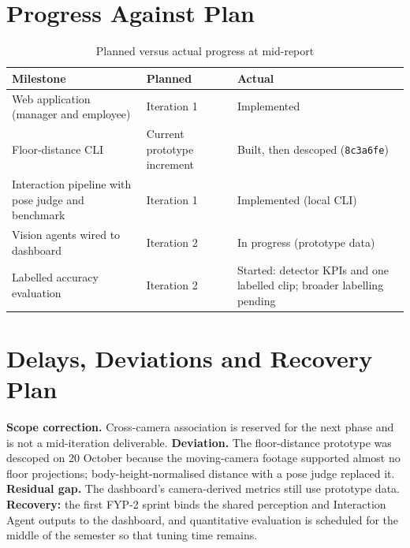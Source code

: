 \section{Progress Against Plan}
\begin{table}[H]
\centering
\caption{Planned versus actual progress at mid-report}
\begin{tabular}{P{0.34\textwidth}P{0.2\textwidth}P{0.3\textwidth}}
\toprule
Milestone & Planned & Actual\\
\midrule
Web application (manager and employee) & Iteration 1 & Implemented\\
Floor-distance CLI & Current prototype increment & Built, then descoped (\texttt{8c3a6fe})\\
Interaction pipeline with pose judge and benchmark & Iteration 1 & Implemented (local CLI)\\
Vision agents wired to dashboard & Iteration 2 & In progress (prototype data)\\
Labelled accuracy evaluation & Iteration 2 & Started: detector KPIs and one labelled clip; broader labelling pending\\
\bottomrule
\end{tabular}
\end{table}

\section{Delays, Deviations and Recovery Plan}
\textbf{Scope correction.} Cross-camera association is reserved for the next phase and is not a mid-iteration deliverable. \textbf{Deviation.} The floor-distance prototype was descoped on 20 October because the moving-camera footage supported almost no floor projections; body-height-normalised distance with a pose judge replaced it. \textbf{Residual gap.} The dashboard's camera-derived metrics still use prototype data. \textbf{Recovery:} the first FYP-2 sprint binds the shared perception and Interaction Agent outputs to the dashboard, and quantitative evaluation is scheduled for the middle of the semester so that tuning time remains.
